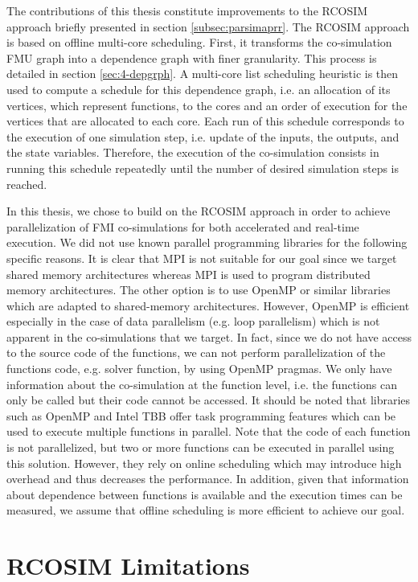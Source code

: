 The contributions of this thesis constitute improvements to the RCOSIM approach briefly presented in section \ref{subsec:parsimaprr}. The RCOSIM approach is based on offline multi-core scheduling. First, it transforms the co-simulation FMU graph into a dependence graph with finer granularity. This process is detailed in section \ref{sec:4-depgrph}. A multi-core list scheduling heuristic is then used to compute a schedule for this dependence graph, i.e. an allocation of its vertices, which represent functions, to the cores and an order of execution for the vertices that are allocated to each core. Each run of this schedule corresponds to the execution of one simulation step, i.e. update of the inputs, the outputs, and the state variables. Therefore, the execution of the co-simulation consists in running this schedule repeatedly until the number of desired simulation steps is reached.

In this thesis, we chose to build on the RCOSIM approach in order to achieve parallelization of FMI co-simulations for both accelerated and real-time execution. We did not use known parallel programming libraries for the following specific reasons. It is clear that MPI is not suitable for our goal since we target shared memory architectures whereas MPI is used to program distributed memory architectures. The other option is to use OpenMP or similar libraries which are adapted to shared-memory architectures. However, OpenMP is efficient especially in the case of data parallelism (e.g. loop parallelism) which is not apparent in the co-simulations that we target. In fact, since we do not have access to the source code of the functions, we can not perform parallelization of the functions code, e.g. solver function, by using OpenMP pragmas. We only have information about the co-simulation at the function level, i.e. the functions can only be called but their code cannot be accessed. It should be noted that libraries such as OpenMP and Intel TBB offer task programming features which can be used to execute multiple functions in parallel. Note that the code of each function is not parallelized, but two or more functions can be executed in parallel using this solution. However, they rely on online scheduling which may introduce high overhead and thus decreases the performance. In addition, given that information about dependence between functions is available and the execution times can be measured, we assume that offline scheduling is more efficient to achieve our goal.   

\section{RCOSIM Limitations}

